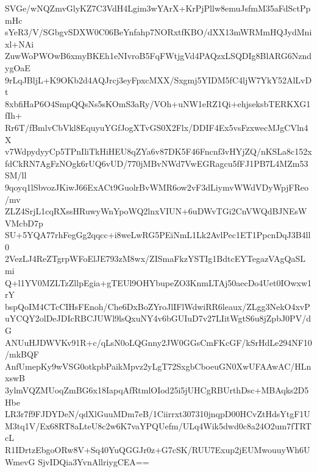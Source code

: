 SVGe/wNQZmvGlyKZ7C3VdH4Lgim3wYArX+KrPjPllw8emuJsfmM35aFdSctPpmHc
sYeR3/V/SGbgvSDXW0C06BeYnfahp7NORxtfKBO/dXX13mWRMmHQJydMnixl+NAi
ZuwWoPWOwB6xmyBKEh1eNIvroB5FqFWtjgVd4PAQzxLSQDIg8BlARG6NzndygOaE
9rLqJBljL+K9OKb2d4AQJrcj3eyFpxcMXX/Sxgmj5YIDM5fC4ljW7YkY52AlLvDt
8xbfiHaP6O4SmpQQsNs5sKOmS3aRy/VOh+uNW1eRZ1Qi+ehjseksbTERKXG1fIh+
Rr6T/fBmlvCbVkl8EquyuYGfJogXTvGS0X2Flx/DDIF4Ex5vsFzxwecMJgCVln4X
v7WdpydyyCp5TPnIliTkHiHEU8qZYa6v87DK5F46Fncnf3vHYjZQ/nKSLa8c152x
fdCkRN7AgFzNOgk6rUQ6vUD/770jMBvNWd7VwEGRagcu5fFJ1PB7L4MZm53SM/ll
9qoyq1lSbvozJKiwJ66ExACt9GuolrBvWMR6ow2vF3dLiymvWWdVDyWpjFReo/mv
ZLZ4SrjL1cqRXssHRuwyWnYpoWQ2lnxVIUN+6uDWvTGi2CnVWQdBJNEsWVMcbD7p
SU+5YQA77rhFegGg2qqcc+i8weLwRG5PEiNmL1Lk2AvlPec1ET1PpcnDqJ3B4ll0
2VezLJ4ReZTgrpWFoElJE793zM8wx/ZISmaFkzYSTIg1BdtcEYTegazVAgQaSLmi
Q+l1YV0MZLTzZllpEgia+gTEUl9OHYbupeZO3KnmLTAj50aecDo4Uet0IOwxw1rY
bspQoIM4CTcCIHsFEnoh/Che6DxBoZYroJlIFlWdwiRR6leaux/ZLgg3NekO4xvP
uYCQY2olDeJDIcRBCJUWl9lsQxuNY4v6bGUIuD7v27LIitWgtS6u8jZpbJ0PV/dG
ANUuHJDWVKv91R+c/qLsN0oLQGnny2JW0GGsCmFKcGF/kSrHdLe294NF10/mkBQF
AnfUmepKy9wVSG0otkpbPaikMpvz2yLgT72SxgbCboeuGN0XwUFAAwAC/HLnxswB
3ylmVQZMUoqZmBG6x18IapqAfRtmlOIod25i5jUHCgRBUrthDsc+MBAqks2D5Hbe
LR3r7f9FJDYDeN/qdXlGuuMDm7eB/1Ciirrxt307310jnqpD00HCvZtHdsYtgF1U
M3tq1V/Ex68RT8aLteU8c2w6K7vaYPQUefm/ULq4Wik5dwd0c8a24O2um7fTRTcL
R1IDrtzEbgoORw8V+Sq40YuQGGJr0z+G7cSK/RUU7Exup2jEUMwouuyWh6UWmevG
SjvIDQia3YvnAllriygCEA==
